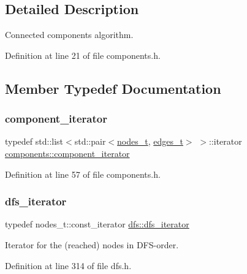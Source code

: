 \subsection{Detailed Description}
Connected components algorithm. 

Definition at line 21 of file components.\+h.



\subsection{Member Typedef Documentation}
\mbox{\label{classcomponents_a0954ef13f83f3c1ac6cd4474cac17a36}} 
\subsubsection{\texorpdfstring{component\+\_\+iterator}{component\_iterator}}
{\footnotesize\ttfamily typedef std\+::list$<$std\+::pair$<$\mbox{\hyperlink{edge_8h_a22ac17689106ba21a84e7bc54d1199d6}{nodes\+\_\+t}}, \mbox{\hyperlink{edge_8h_a8f9587479bda6cf612c103494b3858e3}{edges\+\_\+t}}$>$ $>$\+::iterator \mbox{\hyperlink{classcomponents_a0954ef13f83f3c1ac6cd4474cac17a36}{components\+::component\+\_\+iterator}}}



Definition at line 57 of file components.\+h.

\mbox{\label{classdfs_a15fe023a5a1f7ddda00f3d87110d9a32}} 
\subsubsection{\texorpdfstring{dfs\+\_\+iterator}{dfs\_iterator}}
{\footnotesize\ttfamily typedef nodes\+\_\+t\+::const\+\_\+iterator \mbox{\hyperlink{classdfs_a15fe023a5a1f7ddda00f3d87110d9a32}{dfs\+::dfs\+\_\+iterator}}\hspace{0.3cm}{\ttfamily [inherited]}}



Iterator for the (reached) nodes in D\+F\+S-\/order. 



Definition at line 314 of file dfs.\+h.

